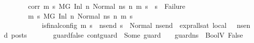 \begin{isabellebody}
\ \ \ \ \ \ \ corr{\isacharcolon}{\kern0pt}\ {\isachardoublequoteopen}{\isasymforall}m{}\ s{}{\isachardot}{\kern0pt}\ {\isacharparenleft}{\kern0pt}M{\isacharcomma}{\kern0pt}{\isasymLambda}{\isacharcomma}{\kern0pt}{\isasymGamma}{\isacharcomma}{\kern0pt}{\isasymOmega}{\isacharcomma}{\kern0pt}G\ {\isasymturnstile}{\isacharparenleft}{\kern0pt}Inl\ n{\isacharcomma}{\kern0pt}\ Normal\ ns{}{\isacharprime}{\kern0pt}{\isacharprime}{\kern0pt}{\isacharparenright}{\kern0pt}\ {\isacharminus}{\kern0pt}n{\isasymrightarrow}{\isacharasterisk}{\kern0pt}\ {\isacharparenleft}{\kern0pt}m{}{\isacharcomma}{\kern0pt}\ s{}{\isacharparenright}{\kern0pt}{\isacharparenright}{\kern0pt}\ {\isasymlongrightarrow}\ s{}\ {\isasymnoteq}\ Failure{\isachardoublequoteclose}\isanewline
\ \ \ \ \ \ \ {\isachardoublequoteopen}{\isasymAnd}m{\isacharprime}{\kern0pt}\ s{\isacharprime}{\kern0pt}{\isachardot}{\kern0pt}\ {\isacharparenleft}{\kern0pt}M{\isacharcomma}{\kern0pt}{\isasymLambda}{\isacharcomma}{\kern0pt}{\isasymGamma}{\isacharcomma}{\kern0pt}{\isasymOmega}{\isacharcomma}{\kern0pt}G\ {\isasymturnstile}{\isacharparenleft}{\kern0pt}Inl\ n{\isacharcomma}{\kern0pt}\ Normal\ ns{}{\isacharprime}{\kern0pt}{\isacharprime}{\kern0pt}{\isacharparenright}{\kern0pt}\ {\isacharminus}{\kern0pt}n{\isasymrightarrow}{\isacharasterisk}{\kern0pt}\ {\isacharparenleft}{\kern0pt}m{\isacharprime}{\kern0pt}{\isacharcomma}{\kern0pt}\ s{\isacharprime}{\kern0pt}{\isacharparenright}{\kern0pt}{\isacharparenright}{\kern0pt}\ {\isasymLongrightarrow}\isanewline
\ \ \ \ \ \ \ \ \ \ \ is{\isacharunderscore}{\kern0pt}final{\isacharunderscore}{\kern0pt}config\ {\isacharparenleft}{\kern0pt}m{\isacharprime}{\kern0pt}{\isacharcomma}{\kern0pt}\ s{\isacharprime}{\kern0pt}{\isacharparenright}{\kern0pt}\ {\isasymLongrightarrow}\ {\isasymforall}ns{\isacharunderscore}{\kern0pt}end{\isachardot}{\kern0pt}\ s{\isacharprime}{\kern0pt}\ {\isacharequal}{\kern0pt}\ Normal\ ns{\isacharunderscore}{\kern0pt}end\ {\isasymlongrightarrow}\ {\isacharparenleft}{\kern0pt}expr{\isacharunderscore}{\kern0pt}all{\isacharunderscore}{\kern0pt}sat\ {\isasymLambda}{}{\isacharunderscore}{\kern0pt}local\ {\isasymGamma}\ {\isasymOmega}\ ns{\isacharunderscore}{\kern0pt}end{\isacharparenright}{\kern0pt}\ posts{\isachardoublequoteclose}\isanewline
\ \ \ \ \ \ \ guard{\isacharunderscore}{\kern0pt}false{\isacharcolon}{\kern0pt}\ {\isachardoublequoteopen}{\isacharparenleft}{\kern0pt}cont{\isacharunderscore}{\kern0pt}guard\ {\isacharequal}{\kern0pt}\ Some\ guard{\isacharparenright}{\kern0pt}\ {\isasymLongrightarrow}\ {\isacharparenleft}{\kern0pt}{\isasymLambda}{\isacharcomma}{\kern0pt}{\isasymGamma}{\isacharcomma}{\kern0pt}{\isasymOmega}\ {\isasymturnstile}\ {\isasymlangle}guard{\isacharcomma}{\kern0pt}ns{}{\isacharprime}{\kern0pt}{\isacharprime}{\kern0pt}{\isasymrangle}\ {\isasymDown}\ BoolV\ False{\isacharparenright}{\kern0pt}{\isachardoublequoteclose}\isanewline

\end{isabellebody}
